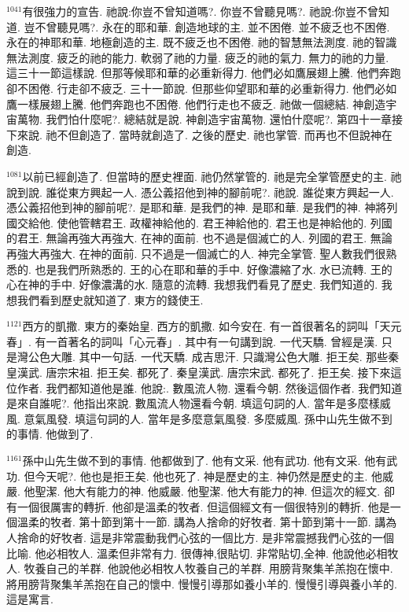 \documentclass{book}
\begin{document}
$^{1041}$有很強力的宣告.
祂說:你豈不曾知道嗎?.
你豈不曾聽見嗎?.
祂說:你豈不曾知道.
豈不曾聽見嗎?.
永在的耶和華.
創造地球的主.
並不困倦.
並不疲乏也不困倦.
永在的神耶和華.
地極創造的主.
既不疲乏也不困倦.
祂的智慧無法測度.
祂的智識無法測度.
疲乏的祂的能力.
軟弱了祂的力量.
疲乏的祂的氣力.
無力的祂的力量.
這三十一節這樣說.
但那等候耶和華的必重新得力.
他們必如鷹展翅上騰.
他們奔跑卻不困倦.
行走卻不疲乏.
三十一節說.
但那些仰望耶和華的必重新得力.
他們必如鷹一樣展翅上騰.
他們奔跑也不困倦.
他們行走也不疲乏.
祂做一個總結.
神創造宇宙萬物.
我們怕什麼呢?.
總結就是說.
神創造宇宙萬物.
還怕什麼呢?.
第四十一章接下來說.
祂不但創造了.
當時就創造了.
之後的歷史.
祂也掌管.
而再也不但說神在創造.

$^{1081}$以前已經創造了.
但當時的歷史裡面.
祂仍然掌管的.
祂是完全掌管歷史的主.
祂說到說.
誰從東方興起一人.
憑公義招他到神的腳前呢?.
祂說.
誰從東方興起一人.
憑公義招他到神的腳前呢?.
是耶和華.
是我們的神.
是耶和華.
是我們的神.
神將列國交給他.
使他管轄君王.
政權神給他的.
君王神給他的.
君王也是神給他的.
列國的君王.
無論再強大再強大.
在神的面前.
也不過是個滅亡的人.
列國的君王.
無論再強大再強大.
在神的面前.
只不過是一個滅亡的人.
神完全掌管.
聖人數我們很熟悉的.
也是我們所熟悉的.
王的心在耶和華的手中.
好像濃縮了水.
水已流轉.
王的心在神的手中.
好像濃溝的水.
隨意的流轉.
我想我們看見了歷史.
我們知道的.
我想我們看到歷史就知道了.
東方的錢使王.

$^{1121}$西方的凱撒.
東方的秦始皇.
西方的凱撒.
如今安在.
有一首很著名的詞叫「天元春」.
有一首著名的詞叫「心元春」.
其中有一句講到說.
一代天驕.
曾經是漢.
只是灣公色大雕.
其中一句話.
一代天驕.
成吉思汗.
只識灣公色大雕.
拒王矣.
那些秦皇漢武.
唐宗宋祖.
拒王矣.
都死了.
秦皇漢武.
唐宗宋武.
都死了.
拒王矣.
接下來這位作者.
我們都知道他是誰.
他說:.
數風流人物.
還看今朝.
然後這個作者.
我們知道是來自誰呢?.
他指出來說.
數風流人物還看今朝.
填這句詞的人.
當年是多麼樣威風.
意氣風發.
填這句詞的人.
當年是多麼意氣風發.
多麼威風.
孫中山先生做不到的事情.
他做到了.

$^{1161}$孫中山先生做不到的事情.
他都做到了.
他有文采.
他有武功.
他有文采.
他有武功.
但今天呢?.
他也是拒王矣.
他也死了.
神是歷史的主.
神仍然是歷史的主.
他威嚴.
他聖潔.
他大有能力的神.
他威嚴.
他聖潔.
他大有能力的神.
但這次的經文.
卻有一個很厲害的轉折.
他卻是溫柔的牧者.
但這個經文有一個很特別的轉折.
他是一個溫柔的牧者.
第十節到第十一節.
講為人捨命的好牧者.
第十節到第十一節.
講為人捨命的好牧者.
這是非常震動我們心弦的一個比方.
是非常震撼我們心弦的一個比喻.
他必相牧人.
溫柔但非常有力.
很傳神,很貼切.
非常貼切,全神.
他說他必相牧人.
牧養自己的羊群.
他說他必相牧人牧養自己的羊群.
用膀背聚集羊羔抱在懷中.
將用膀背聚集羊羔抱在自己的懷中.
慢慢引導那如養小羊的.
慢慢引導與養小羊的.
這是寓言.
\end{document}
